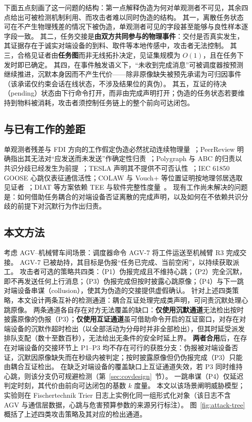 \documentclass[manuscript,screen,review]{acmart}
\begin{document}
下面五点刻画了这一问题的结构：第一点解释伪造为何对单观测者不可见，其余四点给出可被检测机制利用、而攻击者难以同时伪造的结构。
其一，离散任务状态可在不产生物理残差的情况下被伪造，单观测者可见的字段甚至能够与良性样本逐字段一致。
其二，任务交接是\textbf{由双方共同参与的物理事件}：交付是否真实发生，其证据存在于诚实对端设备的到料、取件等本地传感中，攻击者无法控制。
其三，合格见证者由\textbf{任务图}而非无线拓扑决定，见证集规模为 $O(1)$，且在任务下发时即已确定。
其四，在事件触发语义下，``未收到完成消息''可被调度器按预测继续推进，沉默本身因而不产生代价——除非原像缺失被预先承诺为可归因事件（该承诺仅约束会话在线状态，不涉及结果位的真伪）。
其五，互证的待决（pending）状态由下行命令打开，而非由完成声明打开；伪造的任务状态若要维持到物料被消耗，攻击者须控制任务链上的整个前向可达闭包。

\subsection{与已有工作的差距}

单观测者残差与 FDI 方向的工作假定伪造必然扰动连续物理量~\cite{ditof2024,dtmpc2025}；PeerReview 明确指出其无法对``应发送而未发送''作确定性归责~\cite{peerreview2007}；Polygraph 与 ABC 的归责以共识分歧已经发生为前提~\cite{polygraph2021,abc2023}；TESLA 声明其不提供不可否认性~\cite{tesla2001,rfc4082}；IEC 61850 GOOSE 心跳仅表征通信活性；COLAW 与 Vouch+ 等位置证明按地理邻居选取见证者~\cite{colaw2020,vouch2019}；DIAT 等方案依赖 TEE 与软件完整性度量~\cite{diat2019}。
现有工作尚未解决的问题是：如何借助任务耦合的对端设备否证离散的完成声明，以及如何在不依赖共识分歧的前提下对沉默行为作出归责。

\subsection{本文方法}

考虑 AGV--机械臂车间场景：调度器命令 AGV-7 将工件运送至机械臂 R3 完成交接。
AGV-7 已被劫持，其目标是伪报``任务已完成、当前空闲''，以持续获取派工。
攻击者可选的策略共四类：（P1）伪报完成且不维持心跳；（P2）完全沉默，即不再发送任何上行消息；（P3）伪报完成但按时披露心跳原像；（P4）与下一跳对端设备串谋（collusion），使其为伪造的交接提供虚假确认。
针对上述四类策略，本文设计两条互补的检测通道：耦合互证处理完成类声明，可问责沉默处理心跳原像。
两条通道各自存在对方无法覆盖的缺口：\textbf{仅使用沉默通道}无法检出按时披露原像的伪报（P3）；\textbf{仅使用互证通道}虽可借助命令开启的互证窗口，对存在对端设备的沉默作超时检出（以全部活动为分母时并非全部检出），但其时延受派发排队支配（数十至数百秒），无法给出无条件的安全时延上界。
\textbf{两者合用}后，在存在对端设备的交接环节上 P1--P3 均不存在可行的获胜分支：伪报被对端设备否证，沉默因原像缺失而在秒级内被判定；按时披露原像但仍伪报完成（P3）只能由耦合互证检出。
在缺乏对端设备的覆盖缺口上互证通道失效，若 P3 同时维持心跳，则该分支仍可规避检测（第~\ref{sec:covdesign}~节）。
一跳串谋（P4）仅延迟判定时刻，其代价由前向可达闭包的基数 $k$ 度量。
本文以该场景阐明威胁模型；实验则在 Fischertechnik Trier 日志上实例化同一组形式化对象（该日志不含 AGV 与通信层数据，心跳与危害预算参数的来源另行标注）。
图~\ref{fig:attack-tree} 概括了上述四类攻击策略及其对应的检出通道。
\end{document}
